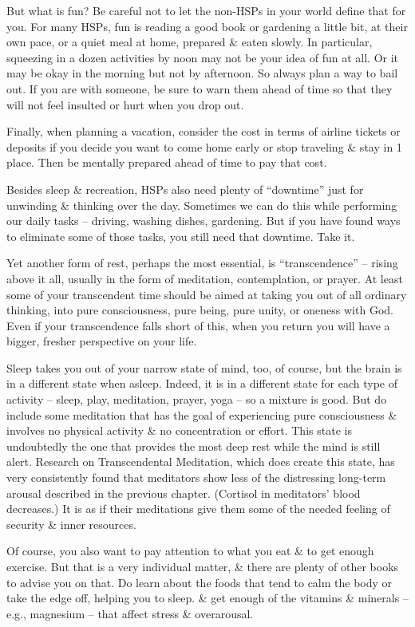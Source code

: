 \documentclass{article}
\numberwithin{equation}{section}
\begin{document}
But what is fun? Be careful not to let the non-HSPs in your world define that for you. For many HSPs, fun is reading a good book or gardening a little bit, at their own pace, or a quiet meal at home, prepared \& eaten slowly. In particular, squeezing in a dozen activities by noon may not be your idea of fun at all. Or it may be okay in the morning but not by afternoon. So always plan a way to bail out. If you are with someone, be sure to warn them ahead of time so that they will not feel insulted or hurt when you drop out.

Finally, when planning a vacation, consider the cost in terms of airline tickets or deposits if you decide you want to come home early or stop traveling \& stay in 1 place. Then be mentally prepared ahead of time to pay that cost.

Besides sleep \& recreation, HSPs also need plenty of ``downtime'' just for unwinding \& thinking over the day. Sometimes we can do this while performing our daily tasks -- driving, washing dishes, gardening. But if you have found ways to eliminate some of those tasks, you still need that downtime. Take it.

Yet another form of rest, perhaps the most essential, is ``transcendence'' -- rising above it all, usually in the form of meditation, contemplation, or prayer. At least some of your transcendent time should be aimed at taking you out of all ordinary thinking, into pure consciousness, pure being, pure unity, or oneness with God. Even if your transcendence falls short of this, when you return you will have a bigger, fresher perspective on your life.

Sleep takes you out of your narrow state of mind, too, of course, but the brain is in a different state when asleep. Indeed, it is in a different state for each type of activity -- sleep, play, meditation, prayer, yoga -- so a mixture is good. But do include some meditation that has the goal of experiencing pure consciousness \& involves no physical activity \& no concentration or effort. This state is undoubtedly the one that provides the most deep rest while the mind is still alert. Research on Transcendental Meditation, which does create this state, has very consistently found that meditators show less of the distressing long-term arousal described in the previous chapter. (Cortisol in meditators' blood decreases.) It is as if their meditations give them some of the needed feeling of security \& inner resources.

Of course, you also want to pay attention to what you eat \& to get enough exercise. But that is a very individual matter, \& there are plenty of other books to advise you on that. Do learn about the foods that tend to calm the body or take the edge off, helping you to sleep. \& get enough of the vitamins \& minerals -- e.g., magnesium -- that affect stress \& overarousal.
\end{document}

